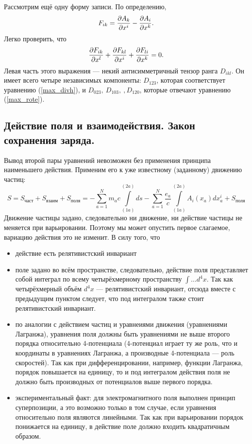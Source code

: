     \begin{note} Рассмотрим ещё одну форму записи. По определению,
        \[
            F_{ik} = \frac{\partial A_k}{\partial x^i} - \frac{\partial A_i}{\partial x^k}.
        \]
        Легко проверить, что
        \[
            \frac{\partial F_{ik}}{\partial x^l} + \frac{\partial F_{kl}}{\partial x^i} + \frac{\partial F_{li}}{\partial x^k} = 0.
        \]
        Левая часть этого выражения --- некий антисимметричный тензор  ранга $D_{ikl}$.
        Он имеет всего четыре независимых компоненты: $D_{123}$, которая соответствует уравнению (\ref{max_divh}),
        и $D_{023}, \: D_{103}, \:, D_{120}$, которые отвечают уравнению (\ref{max_rote}).
    \end{note}

\subsection{Действие поля и взаимодействия. Закон сохранения заряда.}
    Вывод второй пары уравнений невозможен без применения принципа наименьшего действия. Применим его к уже известному (заданному)
    движению частиц:
    \[
        S = S_{\textrm{част}} + S_{\textrm{взаим}} + S_{\textrm{поля}} =
        -\sum_{a=1}^N m_a c \int\limits_{(1a)}^{(2a)}ds -\sum_{a=1}^N  \frac{e_a}{c} \int\limits_{(1a)}^{(2a)}A_i(x_a)dx_a^i + S_{\textrm{поля}}
    \]
    Движение частицы задано, следовательно ни движение, ни действие частицы не меняется при варьировании. Поэтому мы может опустить первое слагаемое,
    вариацию действия это не изменит.
    В силу того, что
    \begin{itemize}
        \item действие есть релятивистский инвариант
        \item поле задано во всём пространстве, следовательно, действие поля представляет собой интеграл по всему четырёхмерному пространству $\int \ldots d^4x$.
            Так как четырёхмерный объём $d^4x$ --- релятивистский инвариант, отсюда вместе с предыдущим пунктом следует, что под интегралом
            также стоит релятивистский инвариант.
        \item по аналогии с действием частиц и уравнеиями движения (уравнениями Лагранжа), уравнения поля должны быть уравнениями не выше второго
            порядка относительно 4-потенциала (4-потенциал играет ту же роль, что и координаты в уравнениях Лагранжа, а производные 4-потенциала --- роль скоростей). 
            Так как при дифференцировании, например, функции Лагранжа, порядок повышается на единицу, то и под интегралом действия поля
            не должно быть производных от потенциалов выше первого порядка.
        \item экспериментальный факт: для электромагнитного поля выполнен принцип суперпозиции, а это возможно только в том случае, если уравнения
            относительно поля являются линейными. Так как при варьировании порядок понижается на единицу, в действие поле должно входить
            квадратичным образом.
    \end{itemize}
